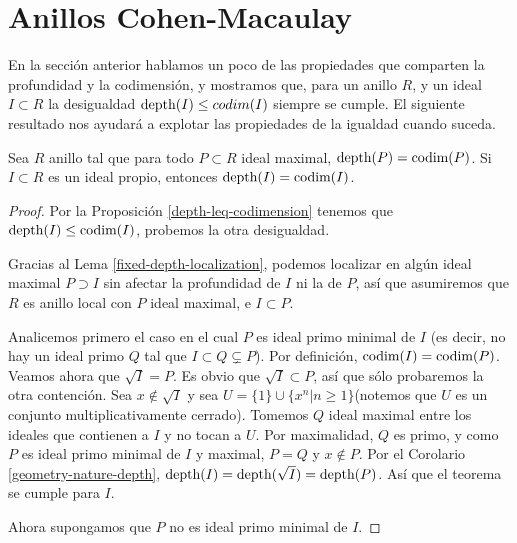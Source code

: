 \section{Anillos Cohen-Macaulay}

En la sección anterior hablamos un poco de las propiedades que comparten la profundidad y la codimensión, y mostramos que, para un anillo $R$, y un ideal $I \subset R$ la desigualdad $\textrm{depth}(I) \leq codim(I)$ siempre se cumple. El siguiente resultado nos ayudará a explotar las propiedades de la igualdad cuando suceda.

\begin{theorem}
Sea $R$ anillo tal que para todo $P\subset R$ ideal maximal, $\textrm{depth}(P) = \textrm{codim}(P)$. Si $I \subset R$ es un ideal propio, entonces $\textrm{depth}(I) = \textrm{codim}(I)$.
\end{theorem}

\begin{proof}
Por la Proposición \ref{depth-leq-codimension} tenemos que $\textrm{depth}(I) \leq \textrm{codim}(I)$, probemos la otra desigualdad.

Gracias al Lema \ref{fixed-depth-localization}, podemos localizar en algún ideal maximal $P \supset I$ sin afectar la profundidad de $I$ ni la de $P$, así que asumiremos que $R$ es anillo local con $P$ ideal maximal, e $I \subset P$. 

Analicemos primero el caso en el cual $P$ es ideal primo minimal de $I$ (es decir, no hay un ideal primo $Q$ tal que $I \subset Q \subsetneq P$). Por definición, $\textrm{codim}(I) = \textrm{codim}(P)$. Veamos ahora que $\sqrt{I} = P$. Es obvio que $\sqrt{I} \subset P$, así que sólo probaremos la otra contención. Sea $x \not\in \sqrt{I}$ y sea $U = \{1\}\cup\{x^n|n \geq 1\}$(notemos que $U$ es un conjunto multiplicativamente cerrado). Tomemos $Q$ ideal maximal entre los ideales que contienen a $I$ y no tocan a $U$. Por maximalidad, $Q$ es primo, y como $P$ es ideal primo minimal de $I$ y maximal, $P = Q$ y $x \not\in P$. Por el Corolario \ref{geometry-nature-depth}, $\textrm{depth}(I) = \textrm{depth}(\sqrt{I}) = \textrm{depth}(P)$. Así que el teorema se cumple para $I$.

Ahora supongamos que $P$ no es ideal primo minimal de $I$.
\end{proof}